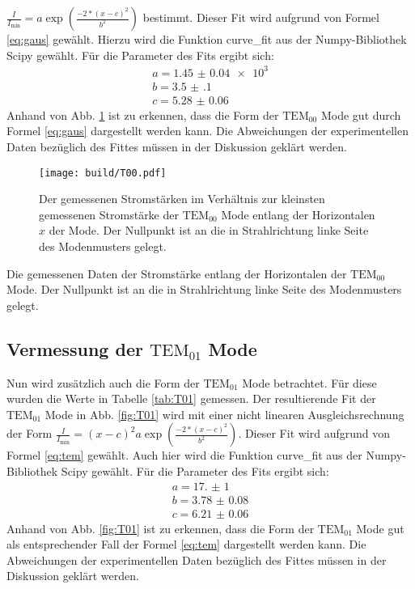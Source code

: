 	$\frac{I}{I_\text{min}} = a \exp \left( \frac{-2*(x-c)^2}{b^2}\right)$
bestimmt. Dieser Fit wird aufgrund von Formel \eqref{eq:gaus} gewählt. Hierzu wird die Funktion curve\_fit aus der Numpy-Bibliothek Scipy \cite{scipy} gewählt. Für die Parameter des Fits ergibt sich:
\begin{gather*}
a = \num{1.45(4)e3}\\
b = \num{3.5(1)}\\
c = \num{5.28(6)}
\end{gather*}
Anhand von Abb. \ref{fig:T00} ist zu erkennen, dass die Form der $\text{TEM}_\text{00}$ Mode gut durch Formel \eqref{eq:gaus} dargestellt werden kann. Die Abweichungen der experimentellen Daten bezüglich des Fittes müssen in der Diskussion geklärt werden.



\begin{figure}
	\centering
	\texttt{[image: build/T00.pdf]}
	\caption{Der gemessenen Stromstärken im Verhältnis zur kleinsten gemessenen Stromstärke der $\text{TEM}_{00}$ Mode entlang der Horizontalen $x$ der Mode. Der Nullpunkt ist an die in Strahlrichtung linke Seite des Modenmusters gelegt.}
	\label{fig:T00}
\end{figure}

\begin{table}
	\centering
	\caption{Die gemessenen Daten der Stromstärke entlang der Horizontalen der $\text{TEM}_{\text{00}}$ Mode. Der Nullpunkt ist an die in Strahlrichtung linke Seite des Modenmusters gelegt.}
	
	\label{tab:T00}
\end{table}


\subsection{Vermessung der $\text{TEM}_{01}$ Mode}
Nun wird zusätzlich auch die Form der $\text{TEM}_\text{01}$ Mode betrachtet. Für diese wurden die Werte in Tabelle \ref{tab:T01} gemessen. 
Der resultierende Fit der $\text{TEM}_\text{01}$ Mode in Abb. \ref{fig:T01} wird mit einer nicht linearen Ausgleichsrechnung der Form $\frac{I}{I_\text{min}} =  (x-c)^2 a \exp \left( \frac{-2*(x-c)^2}{b^2}\right)$. Dieser Fit wird aufgrund von Formel \eqref{eq:tem} gewählt. Auch hier wird die Funktion curve\_fit aus der Numpy-Bibliothek Scipy \cite{scipy} gewählt. Für die Parameter des Fits ergibt sich:
\begin{gather*}
a = \num{17.(1)}\\
b = \num{3.78(8)}\\
c = \num{6.21(6)}
\end{gather*}
Anhand von Abb. \ref{fig:T01} ist zu erkennen, dass die Form der $\text{TEM}_\text{01}$ Mode gut als entsprechender Fall der Formel \eqref{eq:tem} dargestellt werden kann. Die Abweichungen der experimentellen Daten bezüglich des Fittes müssen in der Diskussion geklärt werden.

